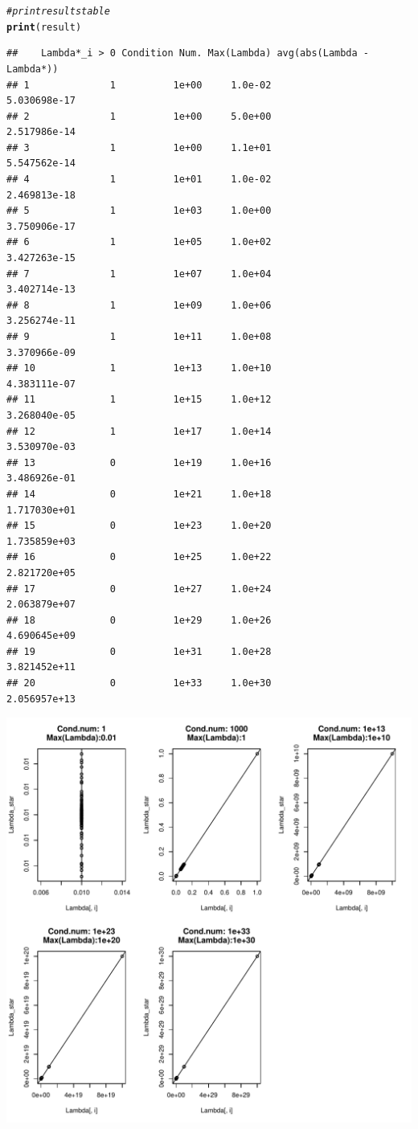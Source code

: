 \documentclass{article}\usepackage[]{graphicx}\usepackage[]{color}
\makeatletter
\def\maxwidth{ %
  \ifdim\Gin@nat@width>\linewidth
    \linewidth
  \else
    \Gin@nat@width
  \fi
}
\newcommand{\hlcom}[1]{\textcolor[rgb]{0.678,0.584,0.686}{\textit{#1}}}%
\newcommand{\hlstd}[1]{\textcolor[rgb]{0.345,0.345,0.345}{#1}}%
\newcommand{\hlkwd}[1]{\textcolor[rgb]{0.737,0.353,0.396}{\textbf{#1}}}%
\newenvironment{kframe}{%
 \def\at@end@of@kframe{}%
 \ifinner\ifhmode%
  \def\at@end@of@kframe{\end{minipage}}%
  \begin{minipage}{\columnwidth}%
 \fi\fi%
 \def\FrameCommand##1{\hskip\@totalleftmargin \hskip-\fboxsep
 \colorbox{shadecolor}{##1}\hskip-\fboxsep
     \hskip-\linewidth \hskip-\@totalleftmargin \hskip\columnwidth}%
 \MakeFramed {\advance\hsize-\width
   \@totalleftmargin\z@ \linewidth\hsize
   \@setminipage}}%
 {\par\unskip\endMakeFramed%
 \at@end@of@kframe}
\newenvironment{knitrout}{}{} %
\makeatother
\begin{document}
\begin{knitrout}
\begin{kframe}
\begin{alltt}
\hlcom{#print results table}
\hlkwd{print}\hlstd{(result)}
\end{alltt}
\begin{verbatim}
##    Lambda*_i > 0 Condition Num. Max(Lambda) avg(abs(Lambda - Lambda*))
## 1              1          1e+00     1.0e-02               5.030698e-17
## 2              1          1e+00     5.0e+00               2.517986e-14
## 3              1          1e+00     1.1e+01               5.547562e-14
## 4              1          1e+01     1.0e-02               2.469813e-18
## 5              1          1e+03     1.0e+00               3.750906e-17
## 6              1          1e+05     1.0e+02               3.427263e-15
## 7              1          1e+07     1.0e+04               3.402714e-13
## 8              1          1e+09     1.0e+06               3.256274e-11
## 9              1          1e+11     1.0e+08               3.370966e-09
## 10             1          1e+13     1.0e+10               4.383111e-07
## 11             1          1e+15     1.0e+12               3.268040e-05
## 12             1          1e+17     1.0e+14               3.530970e-03
## 13             0          1e+19     1.0e+16               3.486926e-01
## 14             0          1e+21     1.0e+18               1.717030e+01
## 15             0          1e+23     1.0e+20               1.735859e+03
## 16             0          1e+25     1.0e+22               2.821720e+05
## 17             0          1e+27     1.0e+24               2.063879e+07
## 18             0          1e+29     1.0e+26               4.690645e+09
## 19             0          1e+31     1.0e+28               3.821452e+11
## 20             0          1e+33     1.0e+30               2.056957e+13
\end{verbatim}
\end{kframe}
\includegraphics[width=\maxwidth]{figure/unnamed-chunk-3-1} 

\end{knitrout}
\end{document}
